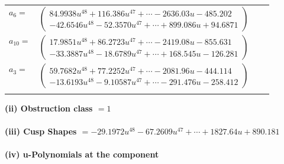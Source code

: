 \documentclass[1p]{elsarticle_modified}
\theoremstyle{definition}
\begin{document}
\begin{tabular}{m{7pt} m{180pt} m{7pt} m{180pt} }
\flushright $a_{6}=$&$\begin{pmatrix}84.9938 u^{48}+116.386 u^{47}+\cdots-2636.03 u-485.202\\-42.6546 u^{48}-52.3570 u^{47}+\cdots+899.086 u+94.6871\end{pmatrix}$ \\
\flushright $a_{10}=$&$\begin{pmatrix}17.9851 u^{48}+86.2723 u^{47}+\cdots-2419.08 u-855.631\\-33.3887 u^{48}-18.6789 u^{47}+\cdots+168.545 u-126.281\end{pmatrix}$ \\
\flushright $a_{3}=$&$\begin{pmatrix}59.7682 u^{48}+77.2252 u^{47}+\cdots-2081.96 u-444.114\\-13.6193 u^{48}-9.10587 u^{47}+\cdots-291.476 u-258.412\end{pmatrix}$\\&\end{tabular}
\flushleft \textbf{(ii) Obstruction class $= 1$}\\~\\
\flushleft \textbf{(iii) Cusp Shapes $= -29.1972 u^{48}-67.2609 u^{47}+\cdots+1827.64 u+890.181$}\\~\\
\newpage\renewcommand{\arraystretch}{1}
\flushleft \textbf{(iv) u-Polynomials at the component}\newline \\
\end{document}
